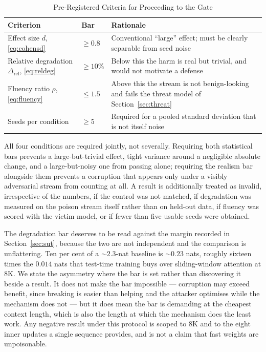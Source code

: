 \documentclass[journal]{IEEEtran}
\begin{document}
\begin{table}[!t]
\renewcommand{\arraystretch}{1.25}
\caption{Pre-Registered Criteria for Proceeding to the Gate}
\label{tab:prereg}
\centering
\footnotesize
\begin{tabular}{|p{}|p{}|p{}|}
\hline
\textbf{Criterion} & \textbf{Bar} & \textbf{Rationale} \\
\hline
Effect size $d$, \eqref{eq:cohensd} & $\geq 0.8$ & Conventional ``large'' effect;
must be clearly separable from seed noise \\
\hline
Relative degradation $\Delta_{\mathrm{rel}}$, \eqref{eq:reldeg} & $\geq 10\%$ &
Below this the harm is real but trivial, and would not motivate a defense \\
\hline
Fluency ratio $\rho$, \eqref{eq:fluency} & $\leq 1.5$ & Above this the stream is not
benign-looking and fails the threat model of Section~\ref{sec:threat} \\
\hline
Seeds per condition & $\geq 5$ & Required for a pooled standard deviation that is
not itself noise \\
\hline
\end{tabular}
\end{table}

All four conditions are required jointly, not severally. Requiring both statistical
bars prevents a large-but-trivial effect, tight variance around a negligible
absolute change, and a large-but-noisy one from passing alone; requiring the
realism bar alongside them prevents a corruption that appears only under a
visibly adversarial stream from counting at all. A result is additionally treated as
invalid, irrespective of the numbers, if the control was not matched, if degradation
was measured on the poison stream itself rather than on held-out data, if fluency was
scored with the victim model, or if fewer than five usable seeds were obtained.

The degradation bar deserves to be read against the margin recorded in
Section~\ref{sec:sut}, because the two are not independent and the comparison is
unflattering. Ten per cent of a ${\sim}2.3$-nat baseline is ${\sim}0.23$ nats,
roughly sixteen times the $0.014$ nats that test-time training buys over
sliding-window attention at 8K. We state the asymmetry where the bar is set rather
than discovering it beside a result. It does not make the bar impossible ---
corruption may exceed benefit, since breaking is easier than helping and the
attacker optimises while the mechanism does not --- but it does mean the bar is
demanding at the cheapest context length, which is also the length at which the
mechanism does the least work. Any negative result under this protocol is scoped
to 8K and to the eight inner updates a single sequence provides, and is not a claim
that fast weights are unpoisonable.
\end{document}
